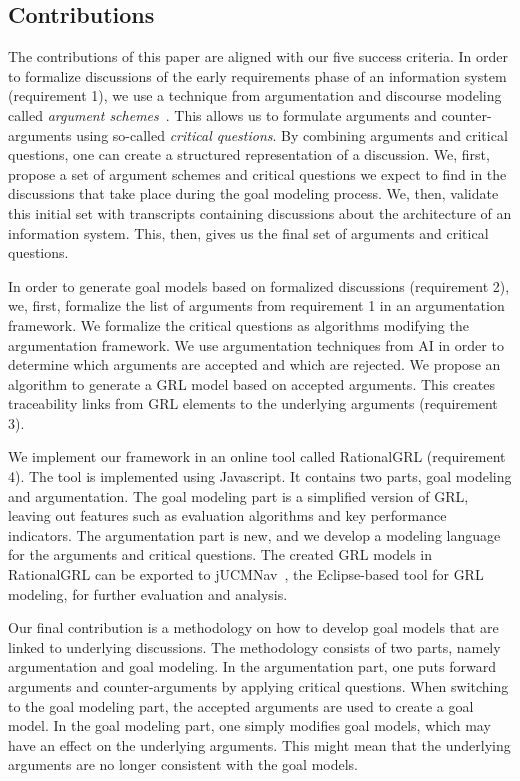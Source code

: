
\subsection{Contributions} 

The contributions of this paper are aligned with our five success criteria. In order to formalize discussions of the early requirements phase of an information system (requirement 1), we use a technique from argumentation and discourse modeling called \emph{argument schemes}~\cite{walton-etal2004}. This allows us to formulate arguments and counter-arguments using so-called \emph{critical questions}. By combining arguments and critical questions, one can create a structured representation of a discussion. We, first, propose a set of argument schemes and critical questions we expect to find in the discussions that take place during the goal modeling process. We, then, validate this initial set with transcripts containing discussions about the architecture of an information system. This, then, gives us the final set of arguments and critical questions.

In order to generate goal models based on formalized discussions (requirement 2), we, first, formalize the list of arguments from requirement 1 in an argumentation framework. We formalize the critical questions as algorithms modifying the argumentation framework. We use argumentation techniques from AI in order to determine which arguments are accepted and which are rejected. We propose an algorithm to generate a GRL model based on accepted arguments. This creates traceability links from GRL elements to the underlying arguments (requirement 3).

We implement our framework in an online tool called RationalGRL (requirement 4). The tool is implemented using Javascript. It contains  two parts, goal modeling and argumentation. The goal modeling part is a simplified version of GRL, leaving out features such as evaluation algorithms and key performance indicators. The argumentation part is new, and we develop a modeling language for the arguments and critical questions. The created GRL models in RationalGRL can be exported to jUCMNav~\cite{}, the Eclipse-based tool for GRL modeling, for further evaluation and analysis. 

Our final contribution is a methodology on how to develop goal models that are linked to underlying discussions. The methodology consists of two parts, namely argumentation and goal modeling. In the argumentation part, one puts forward arguments and counter-arguments by applying critical questions. When switching to the goal modeling part, the accepted arguments are used to create a goal model. In the goal modeling part, one simply modifies goal models, which may have an effect on the underlying arguments. This might mean that the underlying arguments are no longer consistent with the goal models.

